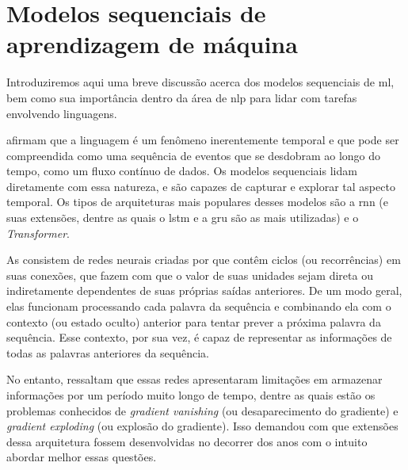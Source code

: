 \section{Modelos sequenciais de aprendizagem de máquina}
\label{sec:modelos-sequenciais}

Introduziremos aqui uma breve discussão acerca dos modelos sequenciais de \acrlong{ml}, bem como sua importância dentro da área de \acrfull{nlp} para lidar com tarefas envolvendo linguagens.

 afirmam que a linguagem é um fenômeno inerentemente temporal e que pode ser compreendida como uma sequência de eventos que se desdobram ao longo do tempo, como um fluxo contínuo de dados.
Os modelos sequenciais lidam diretamente com essa natureza, e são capazes de capturar e explorar tal aspecto temporal.
Os tipos de arquiteturas mais populares desses modelos são a \acrfull{rnn} (e suas extensões, dentre as quais o \acrfull{lstm} e a \acrfull{gru} são as mais utilizadas) e o \textit{Transformer}.


As  consistem de redes neurais criadas por  que contêm ciclos (ou recorrências) em suas conexões, que fazem com que o valor de suas unidades sejam direta ou indiretamente dependentes de suas próprias saídas anteriores.
De um modo geral, elas funcionam processando cada palavra da sequência e combinando ela com o contexto (ou estado oculto) anterior para tentar prever a próxima palavra da sequência. Esse contexto, por sua vez, é capaz de representar as informações de todas as palavras anteriores da sequência.


No entanto,  ressaltam que essas redes apresentaram limitações em armazenar informações por um período muito longo de tempo, dentre as quais estão os problemas conhecidos de \textit{gradient vanishing} (ou desaparecimento do gradiente) e \textit{gradient exploding} (ou explosão do gradiente). Isso demandou com que extensões dessa arquitetura fossem desenvolvidas no decorrer dos anos com o intuito abordar melhor essas questões.

